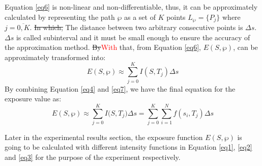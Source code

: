 \documentclass[final]{elsarticle}
\begin{document}
Equation \eqref{eq6} is non-linear and non-differentiable, thus,
it can be approximately calculated by representing the path $\wp $ as a set
of $ K $ points ${L_\wp } = \{ {P_j}\} $ where $j = \overline {0,K} $. \sout{In which,} The distance between two arbitrary consecutive points is $\Delta s$. $\Delta s$ is called subinterval and it must be small enough to ensure the accuracy of the approximation method. \sout{By}\textcolor{red}{With} that, from Equation \eqref{eq6}, $ E(S,\wp ) $, can be approximately transformed into:
\begin{equation}
\label{eq7}
E(S,\wp) \approx \sum\limits_{j = 0}^K {I(S, T_j)\Delta s} 
\end{equation}
By combining Equation \eqref{eq4} and \eqref{eq7}, we have the final equation for the exposure value as:
\begin{equation}
\label{eq8}
E(S,\wp ) \approx \sum\limits_{j = 0}^K {I(S,{T_j}} )\Delta s = \sum\limits_{j = 0}^K {\sum\limits_{i = 1}^N {f({s_i},{T_j})} } \Delta s
\end{equation}

Later in the experimental results section, the exposure function $ E(S,\wp )$ is going to be calculated with different intensity functions in Equation \eqref{eq1}, \eqref{eq2} and \eqref{eq3} for the purpose of the experiment respectively. 
\end{document}
